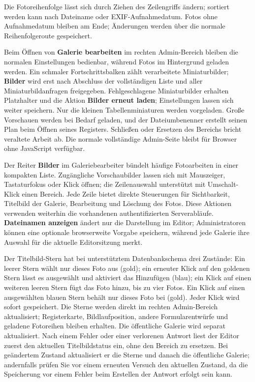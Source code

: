 \documentclass[11pt,a4paper]{article}
\newcommand{\ui}[1]{\textbf{#1}}
\begin{document}
Die Fotoreihenfolge lässt sich durch Ziehen des Zeilengriffs ändern; sortiert
werden kann nach Dateiname oder EXIF-Aufnahmedatum. Fotos ohne Aufnahmedatum
bleiben am Ende; Änderungen werden über die normale Reihenfolgeroute
gespeichert.

Beim Öffnen von \ui{Galerie bearbeiten} im rechten Admin-Bereich bleiben die
normalen Einstellungen bedienbar, während Fotos im Hintergrund geladen werden.
Ein schmaler Fortschrittsbalken zählt verarbeitete Miniaturbilder; \ui{Bilder}
wird erst nach Abschluss der vollständigen Liste und aller Miniaturbildanfragen
freigegeben. Fehlgeschlagene Miniaturbilder erhalten Platzhalter und die Aktion
\ui{Bilder erneut laden}; Einstellungen lassen sich weiter speichern. Nur die
kleinen Tabellenminiaturen werden vorgeladen. Große Vorschauen werden bei Bedarf
geladen, und der Dateiumbenenner erstellt seinen Plan beim Öffnen seines
Registers. Schließen oder Ersetzen des Bereichs bricht veraltete Arbeit ab. Die
normale vollständige Admin-Seite bleibt für Browser ohne JavaScript verfügbar.

Der Reiter \ui{Bilder} im Galeriebearbeiter bündelt häufige Fotoarbeiten in
einer kompakten Liste. Zugängliche Vorschaubilder lassen sich mit Mauszeiger,
Tastaturfokus oder Klick öffnen; die Zeilenauswahl unterstützt mit
Umschalt-Klick einen Bereich. Jede Zeile bietet direkte Steuerungen für
Sichtbarkeit, Titelbild der Galerie, Bearbeitung und Löschung des Fotos. Diese
Aktionen verwenden weiterhin die vorhandenen authentifizierten Serverabläufe.
\ui{Dateinamen anzeigen} ändert nur die Darstellung im Editor; Administratoren
können eine optionale browserweite Vorgabe speichern, während jede Galerie ihre
Auswahl für die aktuelle Editorsitzung merkt.

Der Titelbild-Stern hat bei unterstütztem Datenbankschema drei Zustände: Ein
leerer Stern wählt nur dieses Foto aus (gold); ein erneuter Klick auf den
goldenen Stern lässt es ausgewählt und aktiviert das Hinzufügen (blau); ein
Klick auf einen weiteren leeren Stern fügt das Foto hinzu, bis zu vier Fotos.
Ein Klick auf einen ausgewählten blauen Stern behält nur dieses Foto bei (gold).
Jeder Klick wird sofort gespeichert. Die Sterne werden direkt im rechten
Admin-Bereich aktualisiert; Registerkarte, Bildlaufposition, andere
Formularentwürfe und geladene Fotoreihen bleiben erhalten. Die öffentliche
Galerie wird separat aktualisiert. Nach einem Fehler oder einer verlorenen
Antwort liest der Editor zuerst den aktuellen Titelbildstatus ein, ohne den
Bereich zu ersetzen. Bei geändertem Zustand aktualisiert er die Sterne und
danach die öffentliche Galerie; andernfalls prüfen Sie vor einem erneuten
Versuch den aktuellen Zustand, da die Speicherung vor einem Fehler beim
Erstellen der Antwort erfolgt sein kann.
\end{document}
